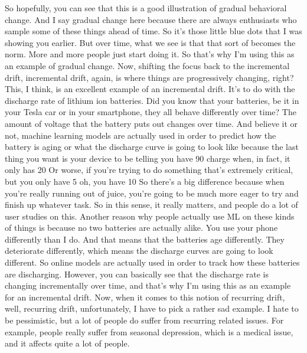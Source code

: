 {{{{{{{{    So hopefully, you can see that this is a good illustration
    of gradual behavioral change.
    And I say gradual change here because there are always
    enthusiasts who sample some of these things ahead of time.
    So it's those little blue dots that I was showing you earlier.
    But over time, what we see is that that sort of becomes the norm.
    More and more people just start doing it.
    So that's why I'm using this as an example of gradual change.
    Now, shifting the focus back to the incremental drift, incremental drift,
    again, is where things are progressively changing, right?
    This, I think, is an excellent example of an incremental drift.
    It's to do with the discharge rate of lithium ion batteries.
    Did you know that your batteries, be it in your Tesla car
    or in your smartphone, they all behave differently over time?
    The amount of voltage that the battery puts out changes over time.
    And believe it or not, machine learning models
    are actually used in order to predict how the battery is aging
    or what the discharge curve is going to look like because the last thing you
    want is your device to be telling you have 90%
    charge when, in fact, it only has 20%
    Or worse, if you're trying to do something that's extremely critical,
    but you only have 5%
    oh, you have 10%
    So there's a big difference because when you're really running out of juice,
    you're going to be much more eager to try and finish up whatever task.
    So in this sense, it really matters, and people
    do a lot of user studies on this.
    Another reason why people actually use ML on these kinds of things
    is because no two batteries are actually alike.
    You use your phone differently than I do.
    And that means that the batteries age differently.
    They deteriorate differently, which means the discharge
    curves are going to look different.
    So online models are actually used in order
    to track how these batteries are discharging.
    However, you can basically see that the discharge rate is changing
    incrementally over time, and that's why I'm using this
    as an example for an incremental drift.
    Now, when it comes to this notion of recurring drift, well, recurring drift,
    unfortunately, I have to pick a rather sad example.
    I hate to be pessimistic, but a lot of people
    do suffer from recurring related issues.
    For example, people really suffer from seasonal depression,
    which is a medical issue, and it affects quite a lot of people.
}}}}}}}}
